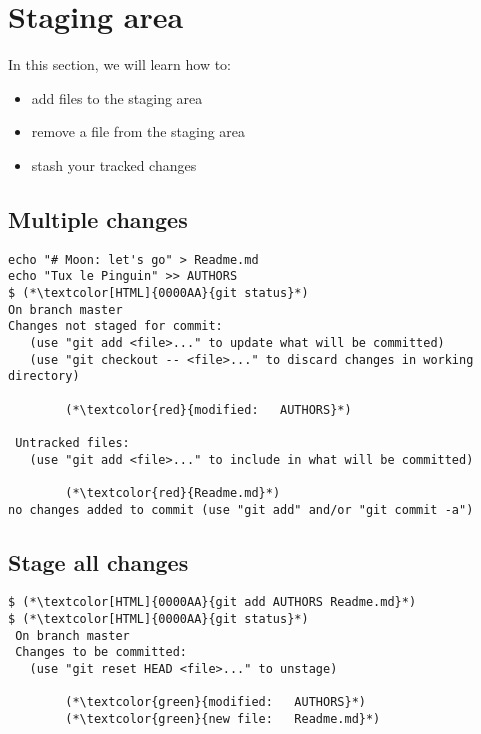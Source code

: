 \section{Staging area}
\begin{frame}[fragile]
  \slidetitle

  In this section, we will learn how to:
  \begin{itemize}
    \item add files to the staging area
    \item remove a file from the staging area
    \item stash your tracked changes
  \end{itemize}
\end{frame}

\subsection{Multiple changes}
\begin{frame}[fragile]
\subslidetitle
\begin{lstlisting}
echo "# Moon: let's go" > Readme.md
echo "Tux le Pinguin" >> AUTHORS
$ (*\textcolor[HTML]{0000AA}{git status}*)
On branch master
Changes not staged for commit:
   (use "git add <file>..." to update what will be committed)
   (use "git checkout -- <file>..." to discard changes in working directory)

        (*\textcolor{red}{modified:   AUTHORS}*)

 Untracked files:
   (use "git add <file>..." to include in what will be committed)

        (*\textcolor{red}{Readme.md}*)
no changes added to commit (use "git add" and/or "git commit -a")
\end{lstlisting}
\end{frame}

\subsection{Stage all changes}
\begin{frame}[fragile]
\subslidetitle
\begin{lstlisting}
$ (*\textcolor[HTML]{0000AA}{git add AUTHORS Readme.md}*)
$ (*\textcolor[HTML]{0000AA}{git status}*)
 On branch master
 Changes to be committed:
   (use "git reset HEAD <file>..." to unstage)

        (*\textcolor{green}{modified:   AUTHORS}*)
        (*\textcolor{green}{new file:   Readme.md}*)

\end{lstlisting}
\end{frame}

